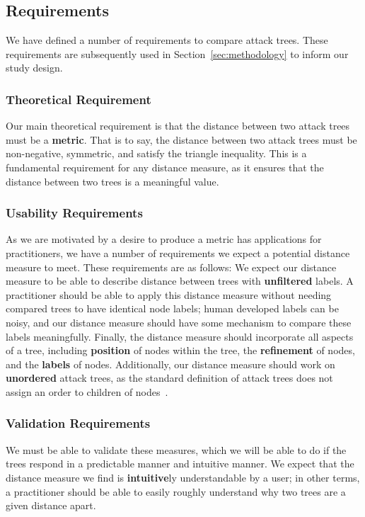 \subsection{Requirements}
\label{ssec:requirements}

We have defined a number of requirements to compare attack trees. These requirements are subsequently used in Section~\ref{sec:methodology} to inform our study design.

\subsubsection{Theoretical Requirement}

Our main theoretical requirement is that the distance between two attack trees must be a \textbf{metric}. That is to say, the distance between two attack trees must be non-negative, symmetric, and satisfy the triangle inequality. This is a fundamental requirement for any distance measure, as it ensures that the distance between two trees is a meaningful value.


\subsubsection{Usability Requirements}

As we are motivated by a desire to produce a metric has applications for practitioners, we have a number of requirements we expect a potential distance measure to meet. These requirements are as follows:
We expect our distance measure to be able to describe distance between trees with \textbf{unfiltered} labels. A practitioner should be able to apply this distance measure without needing compared trees to have identical node labels; human developed labels can be noisy, and our distance measure should have some mechanism to compare these labels meaningfully. Finally, the distance measure should incorporate all aspects of a tree, including \textbf{position} of nodes within the tree, the \textbf{refinement} of nodes, and the \textbf{labels} of nodes. Additionally, our distance measure should work on \textbf{unordered} attack trees, as the standard definition of attack trees does not assign an order to children of nodes~\cite{mauw_foundations_2006}.


\subsubsection{Validation Requirements}

We must be able to validate these measures, which we will be able to do if the trees respond in a predictable manner and intuitive manner. We expect that the distance measure we find is \textbf{intuitive}ly understandable by a user; in other terms, a practitioner should be able to easily roughly understand why two trees are a given distance apart.













